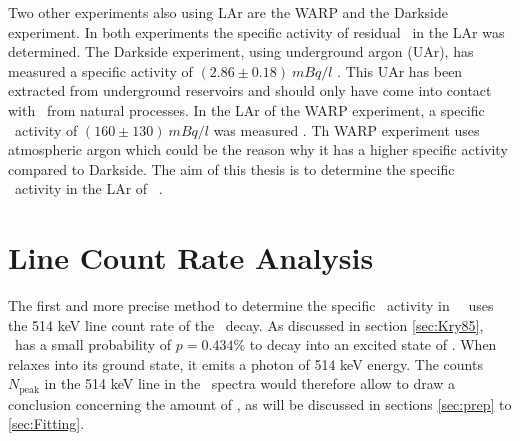 \documentclass[encoding=utf8,british]{tumphthesis}
\begin{document}
Two other experiments also using LAr are the WARP and the Darkside experiment.
In both experiments the specific activity of residual \Kr\ in the LAr was determined.
The Darkside experiment, using underground argon (UAr), has measured a specific activity of \((2.86\pm0.18) \ \unit{mBq}/\unit{l}\)  \cite{agnes_results_2016}.
This UAr has been extracted from underground reservoirs and should only have come into contact with \Kr\ from natural processes.
In the LAr of the WARP experiment, a specific \Kr\ activity of   \((160\pm130) \ \unit{mBq}/\unit{l}\) was measured \cite{benetti_measurement_2006}.
Th WARP experiment uses atmospheric argon which could be the reason why it has a higher specific activity compared to Darkside.
The aim of this thesis is to determine the specific \Kr\ activity in the LAr of \gerda\ \PII.



 
 
 
 
 
 
 
 
 
 
 
 
 
 
 
 
 
 
 
 
 
 
 
 
 
 
 
 
 
 
 
 
 
 
 
 
 
 
 
 
 
 
 
\chapter{Line Count Rate Analysis}
\label{sec:SAfrom514}

The first and more precise method to determine the specific \Kr\ activity in \gerda\ \PII\ uses the 514 keV line count rate of the \Kr\ decay.
As discussed in section \ref{sec:Kry85}, \Kr\ has a small probability of $p=0.434\%$ to decay into an excited state of . 
When  relaxes into its ground state, it emits a photon of 514 keV energy.
The counts $N_{\mathrm{peak}}$ in the 514 keV line in the \gerda\ spectra would therefore allow to draw a conclusion concerning the amount of \Kr, as will be discussed in sections \ref{sec:prep} to \ref{sec:Fitting}. 
\\
\end{document}
